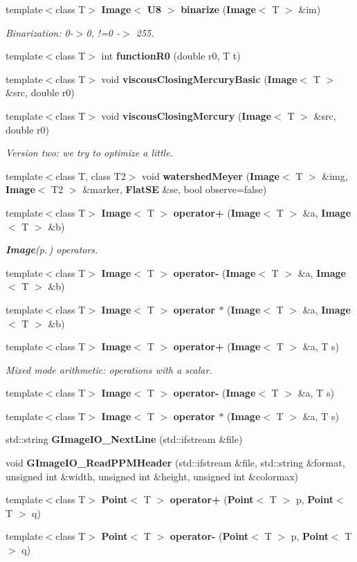 \begin{CompactItemize}
template$<$class T$>$ {\bf Image}$<$ {\bf U8} $>$ {\bf binarize} ({\bf Image}$<$ T $>$ \&im)
\begin{CompactList}\small\item\em Binarization: 0-$>$0, !=0 -$>$ 255. \item\end{CompactList}\item 
template$<$class T$>$ int {\bf function\-R0} (double r0, T t)
\item 
template$<$class T$>$ void {\bf viscous\-Closing\-Mercury\-Basic} ({\bf Image}$<$ T $>$ \&src, double r0)
\item 
template$<$class T$>$ void {\bf viscous\-Closing\-Mercury} ({\bf Image}$<$ T $>$ \&src, double r0)
\begin{CompactList}\small\item\em Version two: we try to optimize a little. \item\end{CompactList}\item 
template$<$class T, class T2$>$ void {\bf watershed\-Meyer} ({\bf Image}$<$ T $>$ \&img, {\bf Image}$<$ T2 $>$ \&marker, {\bf Flat\-SE} \&se, bool observe=false)
\item 
template$<$class T$>$ {\bf Image}$<$ T $>$ {\bf operator+} ({\bf Image}$<$ T $>$ \&a, {\bf Image}$<$ T $>$ \&b)
\begin{CompactList}\small\item\em {\bf Image}{\rm (p.\,\pageref{classLibTIM_1_1Image})} operators. \item\end{CompactList}\item 
template$<$class T$>$ {\bf Image}$<$ T $>$ {\bf operator-} ({\bf Image}$<$ T $>$ \&a, {\bf Image}$<$ T $>$ \&b)
\item 
template$<$class T$>$ {\bf Image}$<$ T $>$ {\bf operator $\ast$} ({\bf Image}$<$ T $>$ \&a, {\bf Image}$<$ T $>$ \&b)
\item 
template$<$class T$>$ {\bf Image}$<$ T $>$ {\bf operator+} ({\bf Image}$<$ T $>$ \&a, T s)
\begin{CompactList}\small\item\em Mixed mode arithmetic: operations with a scalar. \item\end{CompactList}\item 
template$<$class T$>$ {\bf Image}$<$ T $>$ {\bf operator-} ({\bf Image}$<$ T $>$ \&a, T s)
\item 
template$<$class T$>$ {\bf Image}$<$ T $>$ {\bf operator $\ast$} ({\bf Image}$<$ T $>$ \&a, T s)
\item 
std::string {\bf GImage\-IO\_\-Next\-Line} (std::ifstream \&file)
\item 
void {\bf GImage\-IO\_\-Read\-PPMHeader} (std::ifstream \&file, std::string \&format, unsigned int \&width, unsigned int \&height, unsigned int \&colormax)
\item 
template$<$class T$>$ {\bf Point}$<$ T $>$ {\bf operator+} ({\bf Point}$<$ T $>$ p, {\bf Point}$<$ T $>$ q)
\item 
template$<$class T$>$ {\bf Point}$<$ T $>$ {\bf operator-} ({\bf Point}$<$ T $>$ p, {\bf Point}$<$ T $>$ q)
\end{CompactItemize}
